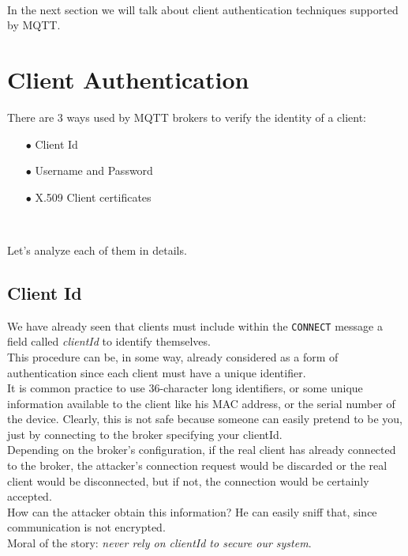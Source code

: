 \documentclass[12pt]{report}
\begin{document}
{\begin{itemize}
\end{itemize}\

In the next section we will talk about client authentication techniques supported by MQTT.


\section{Client Authentication}
\bigskip

There are 3 ways used by MQTT brokers to verify the identity of a client:

\begin{itemize}
\setlength{\itemindent}{+4mm}
  \item[$\bullet$] Client Id
  \item[$\bullet$] Username and Password
  \item[$\bullet$] X.509 Client certificates
\end{itemize}\

Let's analyze each of them in details.\\


\subsection{Client Id}
\bigskip
We have already seen that clients must include within the \texttt{CONNECT} message a field called \emph{clientId} to identify themselves.\\
This procedure can be, in some way, already considered as a form of authentication since each client must have a unique identifier.\\
It is common practice to use 36-character long identifiers, or some unique information available to the client like his MAC address, or the serial number of the device.
Clearly, this is not safe because someone can easily pretend to be you, just by connecting to the broker specifying your clientId.\\
Depending on the broker's configuration, if the real client has already connected to the broker, the attacker's connection request would be discarded or the real client would be disconnected, but if not, the connection would be certainly accepted.\\

How can the attacker obtain this information? He can easily sniff that, since communication is not encrypted.\\

Moral of the story: \emph{never rely on clientId to secure our system}.\\

}
\end{document}
